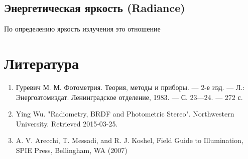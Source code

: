 \documentclass[12pt]{article}
\begin{document}
\subsection{Энергетическая яркость (Radiance)}

По определению яркость излучения это отношение

\newpage

\section{Литература}
\begin{enumerate}
  \item Гуревич М. М. Фотометрия. Теория, методы и приборы. — 2-е изд. — Л.: Энергоатомиздат. Ленинградское отделение, 1983. — С. 23—24. — 272 с.
  \item Ying Wu. "Radiometry, BRDF and Photometric Stereo". Northwestern University. Retrieved 2015-03-25.
  \item A. V. Arecchi, T. Messadi, and R. J. Koshel, Field Guide to Illumination, SPIE Press, Bellingham, WA (2007)
\end{enumerate}
\end{document}
